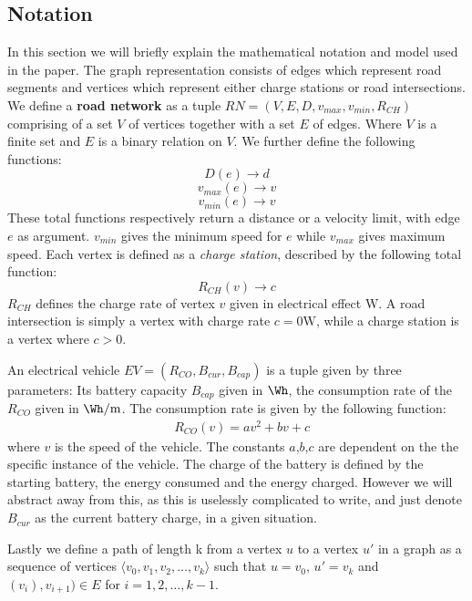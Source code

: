 \subsection{Notation}
In this section we will briefly explain the mathematical notation and model used in the paper. The graph representation consists of edges which represent road segments and vertices which represent either charge stations or road intersections. We define a \textbf{road network} as a tuple $RN=(V,E,D,v_{max},v_{min},R_{CH})$ comprising of a set $V$ of vertices together with a set $E$ of edges. Where $V$ is a finite set and $E$ is a binary relation on $V$. We further define the following functions:
\[ D(e)\rightarrow d \] 
\[ v_{max}(e)\rightarrow v \]
\[ v_{min}(e)\rightarrow v \]
These total functions respectively return a distance or a velocity limit, with edge $e$ as argument. $v_{min}$ gives the minimum speed for $e$ while $v_{max}$ gives maximum speed. Each vertex is defined as a \textit{charge station}, described by the following total function:
\[R_{CH}(v)\rightarrow c\]
$R_{CH}$ defines the charge rate of vertex $v$ given in electrical effect $\si{\W}$. A road intersection is simply a vertex with charge rate $c = 0\si{\W}$, while a charge station is a vertex where $c > 0$.

An electrical vehicle $EV=(R_{CO},B_{cur},B_{cap})$ is a tuple given by three parameters: Its battery capacity $B_{cap}$ given in $\si{\Wh}$, the consumption rate of the $R_{CO}$ given in $\si{\Wh\per\metre}$. The consumption rate is given by the following function:
\begin{equation}
\begin{aligned}
 & R_{CO}(v)=av^2+bv+c
\end{aligned}
\end{equation}\label{eq:chargingFunc}
where $v$ is the speed of the vehicle. The constants $a$,$b$,$c$ are dependent on the the specific instance of the vehicle. The charge of the battery is defined by the starting battery, the energy consumed and the energy charged. However we will abstract away from this, as this is uselessly complicated to write, and just denote $B_{cur}$ as the current battery charge, in a given situation.

Lastly we define a path of length k from a vertex $u$ to a vertex $u'$ in a graph as a sequence of vertices $\langle v_0,v_1,v_2,\dots,v_k \rangle$ such that $u=v_0$, $u'=v_k$ and $(v_{i}),v_{i+1})\in E$ for $i=1,2,\dots ,k-1$.


